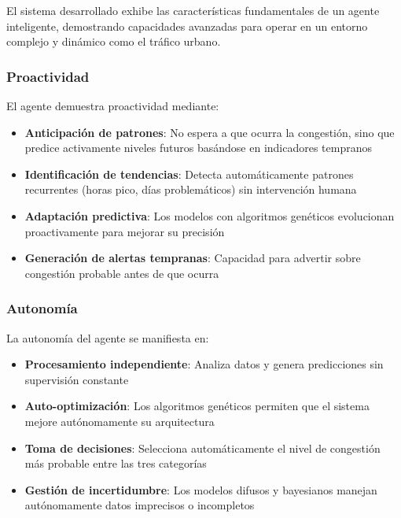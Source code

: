 \documentclass{svproc} %
\begin{document}
El sistema desarrollado exhibe las características fundamentales de un agente inteligente, demostrando capacidades avanzadas para operar en un entorno complejo y dinámico como el tráfico urbano.

\subsubsection{Proactividad}

El agente demuestra proactividad mediante:
\begin{itemize}
    \item \textbf{Anticipación de patrones}: No espera a que ocurra la congestión, sino que predice activamente niveles futuros basándose en indicadores tempranos
    \item \textbf{Identificación de tendencias}: Detecta automáticamente patrones recurrentes (horas pico, días problemáticos) sin intervención humana
    \item \textbf{Adaptación predictiva}: Los modelos con algoritmos genéticos evolucionan proactivamente para mejorar su precisión
    \item \textbf{Generación de alertas tempranas}: Capacidad para advertir sobre congestión probable antes de que ocurra
\end{itemize}

\subsubsection{Autonomía}

La autonomía del agente se manifiesta en:
\begin{itemize}
    \item \textbf{Procesamiento independiente}: Analiza datos y genera predicciones sin supervisión constante
    \item \textbf{Auto-optimización}: Los algoritmos genéticos permiten que el sistema mejore autónomamente su arquitectura
    \item \textbf{Toma de decisiones}: Selecciona automáticamente el nivel de congestión más probable entre las tres categorías
    \item \textbf{Gestión de incertidumbre}: Los modelos difusos y bayesianos manejan autónomamente datos imprecisos o incompletos
\end{itemize}
\end{document}
